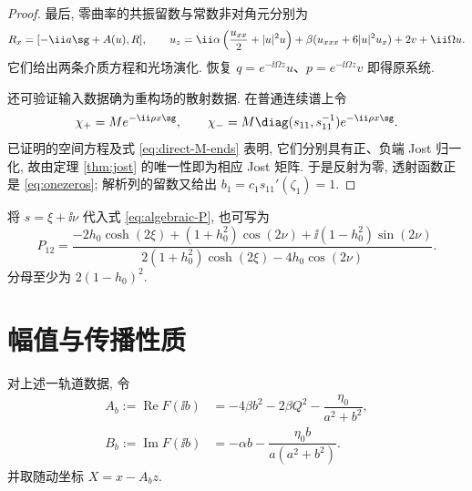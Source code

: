 \begin{proof}
最后, 零曲率的共振留数与常数非对角元分别为
\[
R_x=[-\ii a\sg+A(u),R],\qquad
u_z=\ii\alpha\left(\dfrac{u_{xx}}{2}+|u|^2u\right)
+\beta(u_{xxx}+6|u|^2u_x)+2v+\ii\Omega u.
\]
它们给出两条介质方程和光场演化. 恢复 $q=e^{-\ii\Omega z}u$、$p=e^{-\ii\Omega z}v$ 即得原系统.

还可验证输入数据确为重构场的散射数据. 在普通连续谱上令
\[
\chi_+=M e^{-\ii\rho x\sg},\qquad
\chi_-=M\diag(s_{11},s_{11}^{-1})e^{-\ii\rho x\sg}.
\]
已证明的空间方程及式 \eqref{eq:direct-M-ends} 表明, 它们分别具有正、负端 Jost 归一化, 故由定理 \ref{thm:jost} 的唯一性即为相应 Jost 矩阵. 于是反射为零, 透射函数正是 \eqref{eq:onezeros}; 解析列的留数又给出 $b_1=c_1s_{11}'(\zeta_1)=1$.
\end{proof}

将 $s=\xi+\ii\nu$ 代入式 \eqref{eq:algebraic-P}, 也可写为
\begin{equation}\label{eq:hyperbolic-projector}
P_{12}=\dfrac{-2h_0\cosh(2\xi)+(1+h_0^2)\cos(2\nu)
+\ii(1-h_0^2)\sin(2\nu)}
{2(1+h_0^2)\cosh(2\xi)-4h_0\cos(2\nu)}.
\end{equation}
分母至少为 $2(1-h_0)^2$.

\section{幅值与传播性质}
对上述一轨道数据, 令
\begin{align}
A_b:=\operatorname{Re}F(\ii b)
&=-4\beta b^2-2\beta Q^2-\dfrac{\eta_0}{a^2+b^2},\label{eq:velocity}\\
B_b:=\operatorname{Im}F(\ii b)
&=-\alpha b-\dfrac{\eta_0b}{a(a^2+b^2)}.\label{eq:frequency}
\end{align}
并取随动坐标 $X=x-A_bz$.

